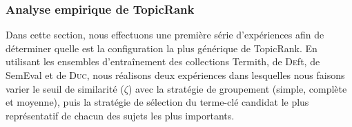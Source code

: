       \subsubsection{Analyse empirique de TopicRank}
      \label{subsubsec:main:domain_independent_keyphrase_extraction-unsupervised_automatic_keyphrase_extraction-evaluation-empirical_analysis_of_topicrank}
        Dans cette section, nous effectuons une première série d'expériences
        afin de déterminer quelle est la configuration la plus générique de
        TopicRank. En utilisant les ensembles d'entraînement des collections
        Termith, de \textsc{De}ft, de SemEval et de \textsc{Duc}, nous réalisons
        deux expériences dans lesquelles nous faisons varier le seuil de
        similarité ($\zeta$) avec la stratégie de groupement (simple, complète
        et moyenne), puis la stratégie de sélection du terme-clé candidat le
        plus représentatif de chacun des sujets les plus importants.
